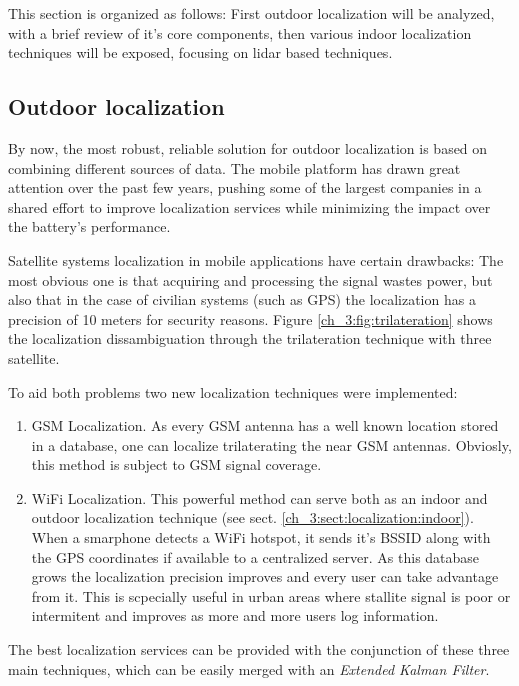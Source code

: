     This section is organized as follows: First outdoor localization will be analyzed, with a brief review of it's core components, then various indoor localization techniques will be exposed, focusing on lidar based techniques.

    \subsection{Outdoor localization} \label{ch_3:sect:localization:outdoor}

      By now, the most robust, reliable solution for outdoor localization is based on combining different sources of data. The mobile platform has drawn great attention over the past few years, pushing some of the largest companies in a shared effort to improve localization services while minimizing the impact over the battery's performance.

      Satellite systems localization in mobile applications have certain drawbacks: The most obvious one is that acquiring and processing the signal wastes power, but also that in the case of civilian systems (such as GPS) the localization has a precision of 10 meters for security reasons. Figure \ref{ch_3:fig:trilateration} shows the localization dissambiguation through the trilateration technique with three satellite.

      To aid both problems two new localization techniques were implemented:
      \begin{enumerate}
        \item GSM Localization. As every GSM antenna has a well known location stored in a database, one can localize trilaterating the near GSM antennas. Obviosly, this method is subject to GSM signal coverage.
        \item WiFi Localization. This powerful method can serve both as an indoor and outdoor localization technique (see sect. \ref{ch_3:sect:localization:indoor}). When a smarphone detects a WiFi hotspot, it sends it's BSSID along with the GPS coordinates if available to a centralized server. As this database grows the localization precision improves and every user can take advantage from it. This is scpecially useful in urban areas where stallite signal is poor or intermitent and improves as more and more users log information.
      \end{enumerate}

      The best localization services can be provided with the conjunction of these three main techniques, which can be easily merged with an \textit{Extended Kalman Filter}.

